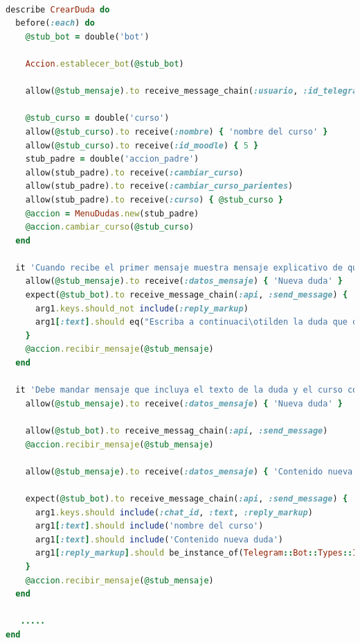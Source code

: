 \begin{lstlisting}[language=Ruby]

describe CrearDuda do
  before(:each) do
    @stub_bot = double('bot')

    Accion.establecer_bot(@stub_bot)

    allow(@stub_mensaje).to receive_message_chain(:usuario, :id_telegram) { 66 }

    @stub_curso = double('curso')
    allow(@stub_curso).to receive(:nombre) { 'nombre del curso' }
    allow(@stub_curso).to receive(:id_moodle) { 5 }
    stub_padre = double('accion_padre')
    allow(stub_padre).to receive(:cambiar_curso)
    allow(stub_padre).to receive(:cambiar_curso_parientes)
    allow(stub_padre).to receive(:curso) { @stub_curso }
    @accion = MenuDudas.new(stub_padre)
    @accion.cambiar_curso(@stub_curso)
  end

  it 'Cuando recibe el primer mensaje muestra mensaje explicativo de que realiza' do
    allow(@stub_mensaje).to receive(:datos_mensaje) { 'Nueva duda' }
    expect(@stub_bot).to receive_message_chain(:api, :send_message) { |arg1|
      arg1.keys.should_not include(:reply_markup)
      arg1[:text].should eq("Escriba a continuaci\otilden la duda que desea crear relacionada con *nombre del curso*:\n")
    }
    @accion.recibir_mensaje(@stub_mensaje)
  end

  it 'Debe mandar mensaje que incluya el texto de la duda y el curso con opciones para confirmar la creaci\otilden de la duda' do
    allow(@stub_mensaje).to receive(:datos_mensaje) { 'Nueva duda' }

    allow(@stub_bot).to receive_messag_chain(:api, :send_message)
    @accion.recibir_mensaje(@stub_mensaje)

    allow(@stub_mensaje).to receive(:datos_mensaje) { 'Contenido nueva duda' }

    expect(@stub_bot).to receive_message_chain(:api, :send_message) { |arg1|
      arg1.keys.should include(:chat_id, :text, :reply_markup)
      arg1[:text].should include('nombre del curso')
      arg1[:text].should include('Contenido nueva duda')
      arg1[:reply_markup].should be_instance_of(Telegram::Bot::Types::InlineKeyboardMarkup)
    }
    @accion.recibir_mensaje(@stub_mensaje)
  end
  
   .....
end

\end{lstlisting}

